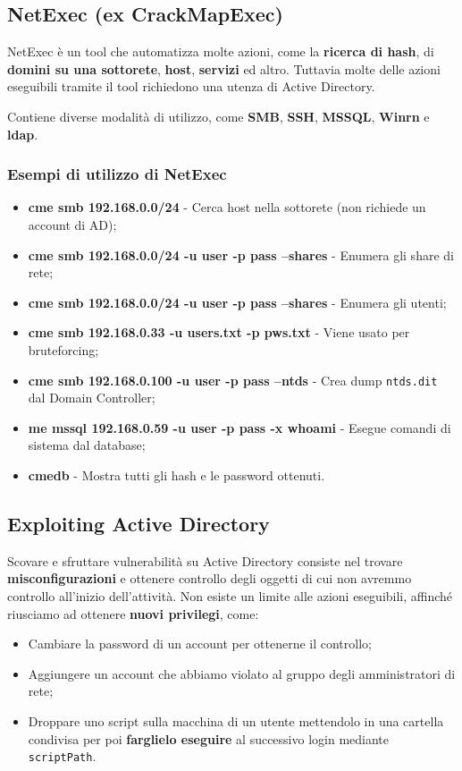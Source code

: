 \documentclass{article}
\begin{document}
\subsection{NetExec (ex CrackMapExec)}
NetExec è un tool che automatizza molte azioni, come la \textbf{ricerca di hash}, di \textbf{domini su una sottorete}, \textbf{host}, \textbf{servizi} ed altro. Tuttavia molte delle azioni eseguibili tramite il tool richiedono una utenza di Active Directory.

Contiene diverse modalità di utilizzo, come \textbf{SMB}, \textbf{SSH}, \textbf{MSSQL}, \textbf{Winrn} e \textbf{ldap}.

\subsubsection{Esempi di utilizzo di NetExec}
\begin{itemize}
	\item \textbf{cme smb 192.168.0.0/24} - Cerca host nella sottorete (non richiede un account di AD);
	
	\item \textbf{cme smb 192.168.0.0/24 -u user -p pass --shares} - Enumera gli share di rete;
	
	\item \textbf{cme smb 192.168.0.0/24 -u user -p pass --shares} - Enumera gli utenti;
	
	\item \textbf{cme smb 192.168.0.33 -u users.txt -p pws.txt} - Viene usato per bruteforcing;
	
	\item \textbf{cme smb 192.168.0.100 -u user -p pass --ntds} - Crea dump \verb|ntds.dit| dal Domain Controller;
	
	\item \textbf{me mssql 192.168.0.59 -u user -p pass -x whoami} - Esegue comandi di sistema dal database;
	
	\item \textbf{cmedb} - Mostra tutti gli hash e le password ottenuti.
\end{itemize}

\newpage

\subsection{Exploiting Active Directory}
Scovare e sfruttare vulnerabilità su Active Directory consiste nel trovare \textbf{misconfigurazioni} e ottenere controllo degli oggetti di cui non avremmo controllo all'inizio dell'attività. Non esiste un limite alle azioni eseguibili, affinché riusciamo ad ottenere \textbf{nuovi privilegi}, come:
\begin{itemize}
	\item Cambiare la password di un account per ottenerne il controllo;
	\item Aggiungere un account che abbiamo violato al gruppo degli amministratori di rete;
	\item Droppare uno script sulla macchina di un utente mettendolo in una cartella condivisa per poi \textbf{farglielo eseguire} al successivo login mediante \verb|scriptPath|.
\end{itemize}
\end{document}
